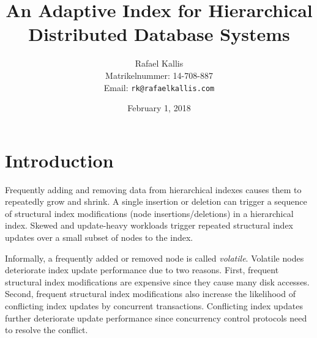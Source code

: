 \documentclass[abstracton,12pt]{scrartcl}
\title{An Adaptive Index for Hierarchical Distributed Database Systems}
\author{
    Rafael Kallis\\[-5pt]
    \scriptsize Matrikelnummer: 14-708-887\\[-5pt]
    \scriptsize Email: \texttt{rk@rafaelkallis.com}
}
\date{\vspace*{2cm}February 1, 2018}
\theoremstyle{definition}
\begin{document}
\maketitle




\newpage





\section{Introduction}

Frequently adding and removing data from hierarchical indexes causes them to repeatedly grow and shrink.
A single insertion or deletion can trigger a sequence of structural index modifications (node insertions/deletions) in a hierarchical index.
Skewed and update-heavy workloads trigger repeated structural index updates over a small subset of nodes to the index.

Informally, a frequently added or removed node is called \textit{volatile}.
Volatile nodes deteriorate index update performance due to two reasons.
First, frequent structural index modifications are expensive since they cause many disk accesses.
Second, frequent structural index modifications also increase the likelihood of conflicting index updates by concurrent transactions.
Conflicting index updates further deteriorate update performance since concurrency control protocols need to resolve the conflict.
\end{document}
